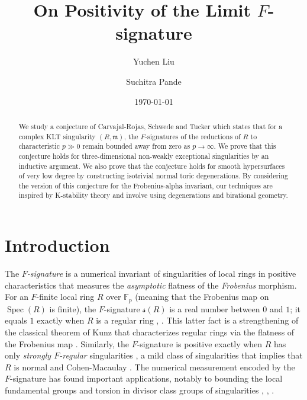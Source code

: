 \documentclass[11pt,reqno]{amsart}
\title{On Positivity of the Limit $F$-signature}
\author{Yuchen Liu}
\author{Suchitra Pande}
\date{\today}
\newcommand{\fm}{\mathfrak{m}}
\DeclareMathOperator{\Spec}{Spec}
\numberwithin{equation}{section}
\theoremstyle{definition}
\newcommand{\s}{\mathscr{s}}
\begin{document}
\begin{abstract}
    We study a conjecture of Carvajal-Rojas, Schwede and Tucker which states that for a complex KLT singularity $(R, \fm)$, the $F$-signatures of the reductions of $R$ to characteristic $p \gg 0$ remain bounded away from zero as $p \to \infty$. We prove that this conjecture holds for three-dimensional non-weakly exceptional singularities by an inductive argument. We also prove that the conjecture holds for smooth hypersurfaces of very low degree by constructing isotrivial normal toric degenerations. By considering the version of this conjecture for the Frobenius-alpha invariant, our techniques are inspired by K-stability theory and involve using degenerations and birational geometry.
\end{abstract}

\maketitle

\section{Introduction}


The \emph{$F$-signature} is a numerical invariant of singularities of local rings in positive characteristics that measures the \emph{asymptotic} flatness of the \emph{Frobenius} morphism. For an $F$-finite local ring $R$ over $\mathbb{F}_p$ (meaning that the Frobenius map on $\Spec(R)$ is finite), the $F$-signature $\s(R)$ is a real number between $0$ and $1$; it equals $1$ exactly when $R$ is a regular ring \cite{HunekeLeuschkeTwoTheoremsAboutMaximal}, \cite{TuckerFSigExists}. This latter fact is a strengthening of the classical theorem of Kunz that characterizes regular rings via the flatness of the Frobenius map \cite{KunzCharacterizationsOfRegularLocalRings}. Similarly, the $F$-signature is positive exactly when $R$ has only \emph{strongly $F$-regular} singularities \cite{AberbachLeuschke}, a mild class of singularities that implies that $R$ is normal and Cohen-Macaulay \cite{HochsterHunekeFRegularityTestElementsBaseChange}. The numerical measurement encoded by the $F$-signature has found important applications, notably to bounding the local fundamental groups and torsion in divisor class groups of singularities \cite{CarvajalRojasSchwedeTuckerFundamentalGroups}, \cite{PolstraATheoremaboutMCMmodule}, \cite{MartinTorsionindivisorclassgroup}.
\end{document}
